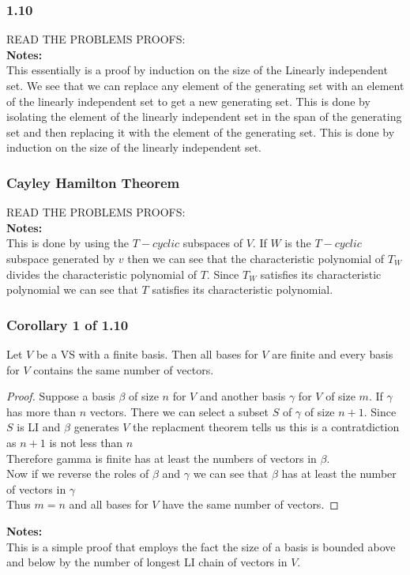 \documentclass[answers,12pt,addpoints]{exam}
\begin{document}
\subsubsection{1.10}
READ THE PROBLEMS PROOFS:\\
\textbf{Notes:}\\
This essentially is a proof by induction on the size of the Linearly independent set. We see that we can replace any element of the generating set with an element of the linearly independent set to get a new generating set. This is done by isolating the element of the linearly independent set in the span of the generating set and then replacing it with the element of the generating set. This is done by induction on the size of the linearly independent set.\\

\subsubsection{Cayley Hamilton Theorem}
READ THE PROBLEMS PROOFS:\\
\textbf{Notes:}\\
This is done by using the $T-cyclic$ subspaces of $V$. If $W$ is the $T-cyclic$ subspace generated by $v$ then we can see that the characteristic polynomial of $T_W$ divides the characteristic polynomial of $T$. Since $T_W$ satisfies its characteristic polynomial we can see that $T$ satisfies its characteristic polynomial.\\

\subsubsection{Corollary 1 of 1.10}
Let $V$ be a VS with a finite basis. Then all bases for $V$ are finite and every basis for $V$ contains the same number of vectors.\\
\begin{proof}
    Suppose a basis $\beta$ of size $n$ for $V$ and another basis $\gamma$ for $V$ of size $m$. If $\gamma$ has more than $n$ vectors. There we can select a subset $S$ of $\gamma$ of size $n+1$. Since $S$ is LI and $\beta$ generates $V$ the replacment theorem tells us this is a contratdiction as $n +1$ is not less than $n$\\
    Therefore gamma is finite has at least the numbers of vectors in $\beta$.\\
    Now if we reverse the roles of $\beta$ and $\gamma$ we can see that $\beta$ has at least the number of vectors in $\gamma$\\
    Thus $m = n$ and all bases for $V$ have the same number of vectors.
\end{proof}
\textbf{Notes:}\\
This is a simple proof that employs the fact the size of a basis is bounded above and below by the number of longest LI chain of vectors in $V$.\\
\end{document}
